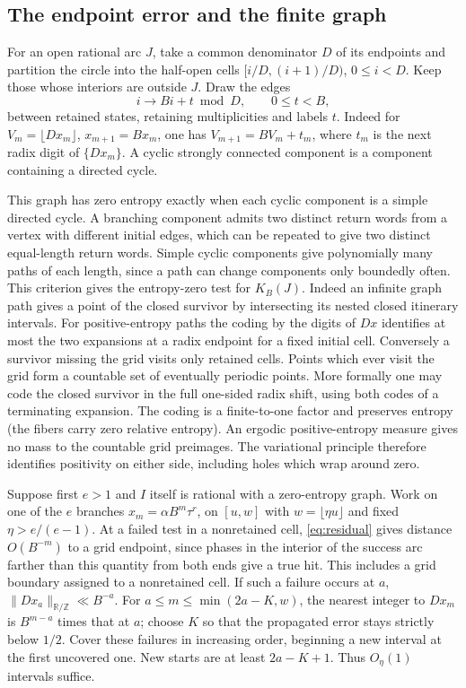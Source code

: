 \documentclass[11pt,reqno,a4paper]{amsart}
\theoremstyle{remark}
\begin{document}
\subsection{The endpoint error and the finite graph}

For an open rational arc \(J\), take a common denominator \(D\) of
its endpoints and partition the circle into the half-open cells
\([i/D,(i+1)/D)\), \(0\le i<D\). Keep those whose interiors are
outside \(J\). Draw the edges
\[
             i\longrightarrow Bi+t\bmod D,\qquad 0\le t<B,
\]
between retained states, retaining multiplicities and labels \(t\).
Indeed for \(V_m=\lfloor D x_m\rfloor\), \(x_{m+1}=Bx_m\),
one has \(V_{m+1}=BV_m+t_m\), where \(t_m\) is the next radix digit
of \(\{D x_m\}\). A cyclic strongly connected component is a component
containing a directed cycle.

This graph has zero entropy exactly when each cyclic component is a
simple directed cycle. A branching component admits two distinct return
words from a vertex with different initial edges, which can be repeated
to give two distinct equal-length return words. Simple cyclic components
give polynomially many paths of each length, since a path can change
components only boundedly often. This criterion gives the entropy-zero
test for \(K_B(J)\). Indeed an infinite graph path gives a point of the
closed survivor by intersecting its nested closed itinerary intervals.
For positive-entropy paths the coding by the digits of \(Dx\) identifies
at most the two expansions at a radix endpoint for a fixed initial cell.
Conversely a survivor missing the grid visits only retained cells. Points
which ever visit the grid form a countable set of eventually periodic
points. More formally one may code the closed survivor in the full
one-sided radix shift, using both codes of a terminating expansion.
The coding is a finite-to-one factor and preserves entropy (the fibers
carry zero relative entropy). An ergodic positive-entropy measure gives
no mass to the countable grid preimages. The variational principle
therefore identifies positivity on either side, including holes which
wrap around zero.

Suppose first \(e>1\) and \(I\) itself is rational with a zero-entropy
graph. Work on one of the \(e\) branches \(x_m=\alpha B^m\tau^r\),
on \([u,w]\) with \(w=\lfloor\eta u\rfloor\) and fixed
\(\eta>e/(e-1)\). At a failed test in a nonretained cell,
\eqref{eq:residual} gives distance \(O(B^{-m})\) to a grid endpoint,
since phases in the interior of the success arc farther than this
quantity from both ends give a true hit. This includes a grid boundary
assigned to a nonretained cell. If such a failure occurs at \(a\),
\(\|D x_a\|_{\mathbb R/\mathbb Z}\ll B^{-a}\). For
\(a\le m\le\min(2a-K,w)\), the nearest integer to \(D x_m\)
is \(B^{m-a}\) times that at \(a\); choose \(K\) so that the propagated
error stays strictly below \(1/2\). Cover these failures in increasing
order, beginning a new interval at the first uncovered one. New starts
are at least \(2a-K+1\). Thus \(O_\eta(1)\) intervals suffice.
\end{document}
